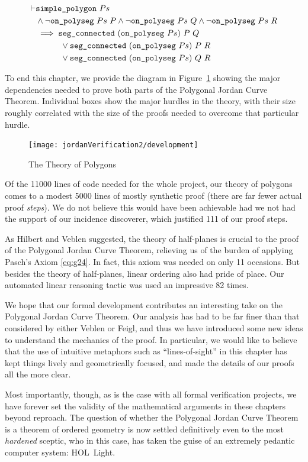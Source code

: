 \begin{align*}
\vdash &\code{simple\_polygon}\ Ps\\
       &\wedge \neg\code{on\_polyseg}\ Ps\ P\wedge \neg\code{on\_polyseg}\ Ps\ Q\wedge \neg\code{on\_polyseg}\ Ps\ R\\
       &\implies \code{seg\_connected}\ (\code{on\_polyseg}\ Ps)\ P\ Q\\
       &\qquad\quad\vee \code{seg\_connected}\ (\code{on\_polyseg}\ Ps)\ P\ R\\
       &\qquad\quad\vee \code{seg\_connected}\ (\code{on\_polyseg}\ Ps)\ Q\ R
\end{align*}

To end this chapter, we provide the diagram in Figure~\ref{fig:JordanTheoryOutline} showing the major dependencies needed to prove both parts of the Polygonal Jordan Curve Theorem. Individual boxes show the major hurdles in the theory, with their size roughly correlated with the size of the proofs needed to overcome that particular hurdle. 

\begin{figure}
\texttt{[image: jordanVerification2/development]}
\caption{The Theory of Polygons}
\label{fig:JordanTheoryOutline}
\end{figure}

Of the 11000 lines of code needed for the whole project, our theory of polygons comes to a modest 5000 lines of mostly synthetic proof (there are far fewer actual proof \emph{steps}). We do not believe this would have been achievable had we not had the support of our incidence discoverer, which justified 111 of our proof steps. 

As Hilbert and Veblen suggested, the theory of half-planes is crucial to the proof of the Polygonal Jordan Curve Theorem, relieving us of the burden of applying Pasch's Axiom \eqref{eq:g24}. In fact, this axiom was needed on only 11 occasions. But besides the theory of half-planes, linear ordering also had pride of place. Our automated linear reasoning tactic was used an impressive 82 times. 

We hope that our formal development contributes an interesting take on the Polygonal Jordan Curve Theorem. Our analysis has had to be far finer than that considered by either Veblen or Feigl, and thus we have introduced some new ideas to understand the mechanics of the proof. In particular, we would like to believe that the use of intuitive metaphors such as ``lines-of-sight'' in this chapter has kept things lively and geometrically focused, and made the details of our proofs all the more clear. 

Most importantly, though, as is the case with all formal verification projects, we have forever set the validity of the mathematical arguments in these chapters beyond reproach. The question of whether the Polygonal Jordan Curve Theorem is a theorem of ordered geometry is now settled definitively even to the most \emph{hardened} sceptic, who in this case, has taken the guise of an extremely pedantic computer system: HOL~Light.

